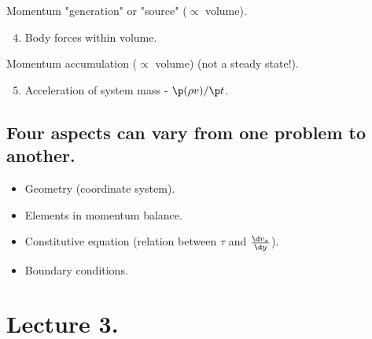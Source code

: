 Momentum "generation" or "source" ($\propto$ volume).
\begin{enumerate}
	\setcounter{enumi}{3}
	\item Body forces within volume.
\end{enumerate}
Momentum accumulation ($\propto$ volume) (not a steady state!).
\begin{enumerate}
	\setcounter{enumi}{4}
	\item Acceleration of system mass - $\p(\rho v)/\p t$.
\end{enumerate}

\subsection{Four aspects can vary from one problem to another.}
\begin{itemize}
	\item Geometry (coordinate system).
	\item Elements in momentum balance.
	\item Constitutive equation (relation between $\tau$ and $\frac{\d v_x}{\d y}$).
	\item Boundary conditions.
\end{itemize}

\section{Lecture 3.}